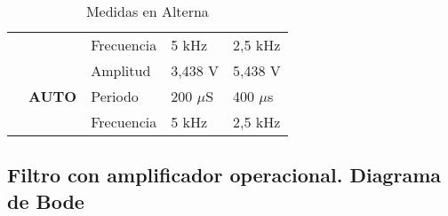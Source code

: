 \begin{table}[H]
\begin{tabular}{rcl|l|l|}
		&       & Frecuencia & 5 kHz & 2,5 kHz \\
		\cmidrule{2-2}          & \multirow{3}[2]{*}{\textcolor[rgb]{ .267,  .329,  .416}{\begin{sideways}\textbf{AUTO}\end{sideways}}} & Amplitud & 3,438 V & 5,438 V \\
		&       & Periodo & 200 $ \mu $S & 400 $ \mu $s \\
		&       & Frecuencia & 5 kHz & 2,5 kHz \\
		\cmidrule{1-2}    \end{tabular}%
	\caption{Medidas en Alterna}
	\label{tab:addlabel}%
\end{table}%


\subsection{Filtro con amplificador operacional. Diagrama de Bode}

